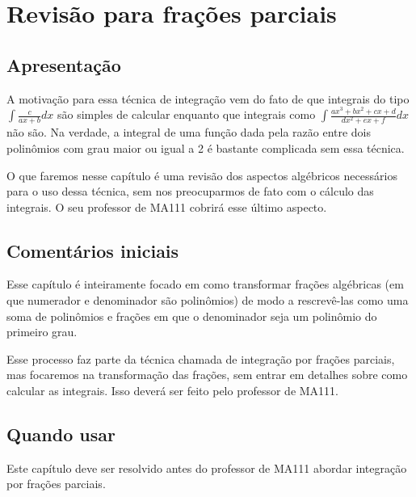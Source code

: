 \documentclass[main_estudante.tex]{subfiles}
\begin{document}
\paraAmbos

\chapter{Revisão para frações parciais}

\paraAlunos

\section{Apresentação}

A motivação para essa técnica de integração vem do fato de que integrais do tipo $\int \frac{c}{ax+b} dx$ são simples de calcular enquanto que integrais como $\int \frac{ax^3+bx^2+cx+d}{dx^2+ex+f} dx$ não são. Na verdade, a integral de uma função dada pela razão entre dois polinômios com grau maior ou igual a 2 é bastante complicada sem essa técnica.

O que faremos nesse capítulo é uma revisão dos aspectos algébricos necessários para o uso dessa técnica, sem nos preocuparmos de fato com o cálculo das integrais. O seu professor de MA111 cobrirá esse último aspecto.

\paraTutores

\section{Comentários iniciais}

Esse capítulo é inteiramente focado em como transformar frações algébricas (em que numerador e denominador são polinômios) de modo a rescrevê-las como uma soma de polinômios e frações em que o denominador seja um polinômio do primeiro grau.

Esse processo faz parte da técnica chamada de integração por frações parciais, mas focaremos na transformação das frações, sem entrar em detalhes sobre como calcular as integrais. Isso deverá ser feito pelo professor de MA111.

\paraAmbos

\section{Quando usar}

Este capítulo deve ser resolvido antes do professor de MA111 abordar integração por frações parciais.
\end{document}

